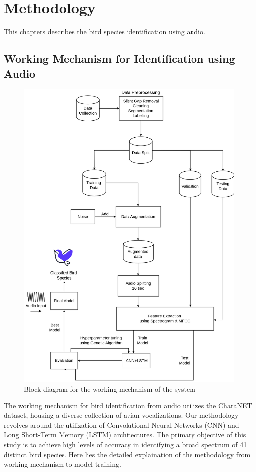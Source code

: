 \chapter{Methodology}
This chapters describes the bird species identification using audio.

\section{Working Mechanism for Identification using Audio}
\begin{figure}[h!]
    \centering
    \includegraphics[scale=0.33]{images/Methodology.png}
    \caption{Block diagram for the working mechanism of the
        system}%
\end{figure}
\newpage
The working mechanism for bird identification from audio utilizes the CharaNET
dataset,
housing a diverse collection of avian vocalizations. Our methodology revolves
around the
utilization of Convolutional Neural Networks (CNN) and Long Short-Term Memory
(LSTM) architectures.
The primary objective of this study is to achieve high levels of accuracy in
identifying a
broad spectrum of 41 distinct bird species. Here lies the detailed explaination
of the methodology
from working mechanism to model training.
